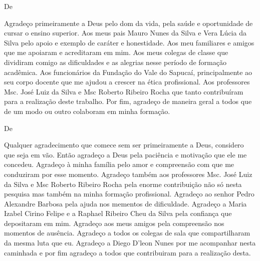 \begin{agradecimentos}

De \imprimirAutorUm
\newline
	\par Agradeço primeiramente a Deus pelo dom da vida, pela saúde e oportunidade
de cursar o ensino superior. Aos meus pais Mauro Nunes da Silva e Vera Lúcia da
Silva pelo apoio e exemplo de caráter e honestidade. Aos meu familiares e
amigos que me apoiaram e acreditaram em mim. Aos meus colegas de classe que
dividiram comigo as dificuldades e as alegrias nesse período de formação
acadêmica. Aos funcionários da Fundação do Vale do Sapucaí, principalmente ao
seu corpo docente que me ajudou a crescer na ética profissional. Aos
professores Msc. José Luiz da Silva e Msc Roberto Ribeiro Rocha que tanto
contribuíram para a realização deste trabalho. Por fim, agradeço de maneira
geral a todos que de um modo ou outro colaboram em minha formação.

\vspace*{\fill}
De \imprimirAutorDois
\newline
	\par Qualquer agradecimento que comece sem ser primeiramente a Deus, considero
que seja em vão. Então agradeço a Deus pela paciência e motivação que ele me
concedeu. Agradeço à minha família pelo amor e compreensão com que me conduziram
por esse momento. Agradeço também aos professores Msc. José Luiz da Silva e Msc
Roberto Ribeiro Rocha pela enorme contribuição não só nesta pesquisa mas também
na minha formação profissional. Agradeço ao senhor Pedro Alexandre Barbosa pela
ajuda nos mementos de dificuldade. Agradeço a Maria Izabel Cirino Felipe e a
Raphael Ribeiro Cheu da Silva pela confiança que depositaram em mim. Agradeço
aos meus amigos pela compreensão nos momentos de ausência. Agradeço a todos os
colegas de sala que compartilharam da mesma luta que eu. Agradeço a Diego
D'leon Nunes por me acompanhar nesta caminhada e por fim agradeço a todos que
contribuiram para a realização desta.

\end{agradecimentos}




